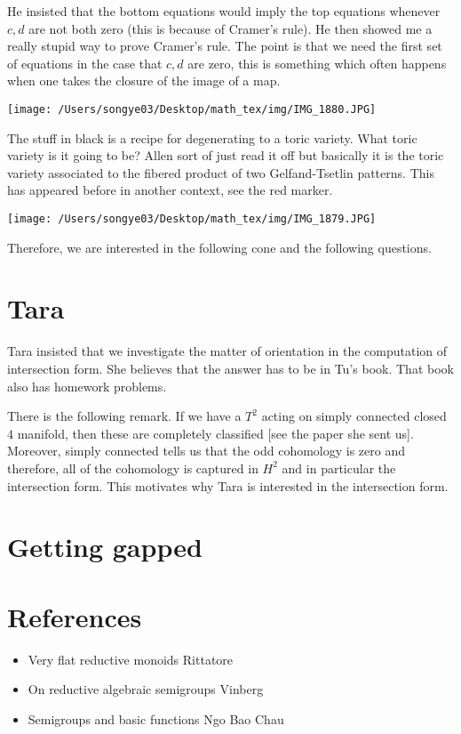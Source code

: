 \documentclass[12pt]{article}
\begin{document}
\hfill

He insisted that the bottom equations would imply the top equations whenever $c,d$ are not both zero (this 
is because of Cramer's rule). He then showed me a really stupid way to prove Cramer's rule. The point is that we 
need the first set of equations in the case that $c,d$ are zero, this is something which often happens when one
 takes the closure of the image of a map.

\begin{center}
    \texttt{[image: /Users/songye03/Desktop/math\_tex/img/IMG\_1880.JPG]}
\end{center}

The stuff in black is a recipe for degenerating to a toric variety. What toric variety is it going to be?
Allen sort of just read it off but basically it is the toric variety associated to the fibered product of two 
Gelfand-Tsetlin patterns. This has appeared before in another context, see the red marker.

\begin{center}
    \texttt{[image: /Users/songye03/Desktop/math\_tex/img/IMG\_1879.JPG]}
\end{center}

Therefore, we are interested in the following cone and the following questions.

\section{Tara}
Tara insisted that we investigate the matter of orientation in the computation of intersection form. 
She believes that the answer has to be in Tu's book. That book also has homework problems.

\hfill

There is the following remark. If we have a $T^2$ acting on simply connected closed $4$ manifold, then these are 
completely classified [see the paper she sent us]. Moreover, simply connected tells us that the odd cohomology is zero and therefore, all of the
cohomology is captured in $H^2$ and in particular the intersection form. This motivates 
why Tara is interested in the intersection form.

\section{Getting gapped}


\section{References}
\begin{itemize}
    \item Very flat reductive monoids Rittatore
    \item On reductive algebraic semigroups Vinberg
    \item Semigroups and basic functions Ngo Bao Chau
\end{itemize}
\end{document}
